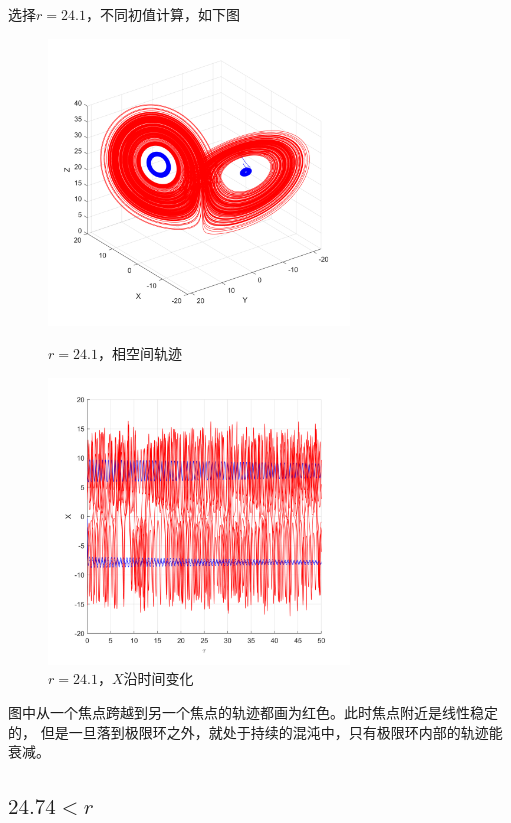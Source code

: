 \documentclass[UTF8,zihao=5]{ctexart} %
\begin{document}
选择$r=24.1$，不同初值计算，如下图
\begin{figure}[H]
    \begin{minipage}[c]{0.45\linewidth}  %
        \centering
        \includegraphics[width=8cm]{XYZ_r_24.1.png}  %
        \caption{$r=24.1$，相空间轨迹}
    \end{minipage}
    \hfill %
    \begin{minipage}[c]{0.45\linewidth}  %
        \centering
        \includegraphics[width=8cm]{XT_r_24.1.png}  %
        \caption{$r=24.1$，$X$沿时间变化}
    \end{minipage}
\end{figure}
图中从一个焦点跨越到另一个焦点的轨迹都画为红色。此时焦点附近是线性稳定的，
但是一旦落到极限环之外，就处于持续的混沌中，只有极限环内部的轨迹能衰减。

\subsection{$24.74<r$}
\end{document}
